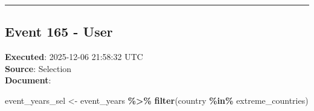 \documentclass[
  11pt,
]{article}
\newenvironment{Shaded}{\begin{snugshade}}{\end{snugshade}}
\newcommand{\FunctionTok}[1]{\textcolor[rgb]{0.13,0.29,0.53}{\textbf{#1}}}
\newcommand{\NormalTok}[1]{#1}
\newcommand{\OtherTok}[1]{\textcolor[rgb]{0.56,0.35,0.01}{#1}}
\newcommand{\SpecialCharTok}[1]{\textcolor[rgb]{0.81,0.36,0.00}{\textbf{#1}}}
\begin{document}
\begin{center}\rule{0.5\linewidth}{0.5pt}\end{center}

\subsection{Event 165 - User}\label{event-165---user}

\textbf{Executed}: 2025-12-06 21:58:32 UTC\\
\textbf{Source}: Selection\\
\textbf{Document}:

\begin{Shaded}
\begin{Highlighting}[]
\NormalTok{event\_years\_sel }\OtherTok{\textless{}{-}}\NormalTok{ event\_years }\SpecialCharTok{\%\textgreater{}\%}
  \FunctionTok{filter}\NormalTok{(country }\SpecialCharTok{\%in\%}\NormalTok{ extreme\_countries)}


\end{Highlighting}
\end{Shaded}
\end{document}
